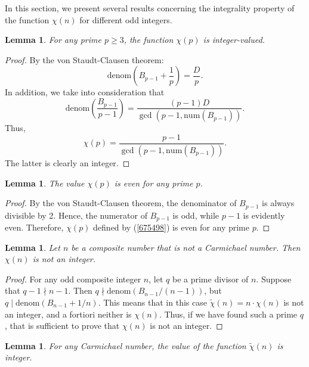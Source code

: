 \documentclass[reqno,a4paper,11pt]{amsart}
\numberwithin{equation}{section}
\newtheorem{lemma}[theorem]{Lemma}
\theoremstyle{definition}
\begin{document}
In this section, we present several results concerning the integrality property  of the function $\chi(n)$ for different odd integers.
\begin{lemma}
For any prime $p\geq 3$, the function $\chi(p)$ is integer-valued.
\end{lemma}
\begin{proof}
By the von Staudt-Clausen theorem:
\[
\mathrm{denom}\left(B_{p-1}+\frac{1}{p}\right)=\frac{D}{p}.
\]
In addition, we take into consideration that
\[
\mathrm{denom}\left(\displaystyle\frac{B_{p-1}}{p-1}\right)=\frac{(p-1)D}{\gcd(p-1, \mathrm{num}(B_{p-1}) )}.
\]
Thus, 
\begin{equation}
\chi(p)=\frac{p-1}{\gcd(p-1, \mathrm{num}(B_{p-1}) )}.
\label{675498}
\end{equation}
The latter is clearly an integer.
\end{proof}
\begin{lemma}  \label{875643}
The value $\chi(p)$  is even for any prime $p$.
\end{lemma}
\begin{proof}
By the von Staudt-Clausen theorem, the denominator of $B_{p-1}$ is always divisible by 2. Hence, the numerator of $B_{p-1}$ is odd, while $p-1$ is evidently even. Therefore, $\chi(p)$ defined by     (\ref{675498}) is even for any prime $p$.
\end{proof}
\begin{lemma}
Let $n$ be a composite number that is not a Carmichael number. Then $\chi(n)$ is not an integer.
\end{lemma}
\begin{proof}
For any odd composite integer $n$, let $q$ be a prime divisor of $n$. Suppose that $q-1\nmid  n-1$.  Then $q\nmid  \mathrm{denom}\left(B_{n-1}/(n-1)\right)$, but $q\mid \mathrm{denom}\left(B_{n-1}+1/n\right)$. This means that in this case $\tilde{\chi}(n)=n\cdot \chi(n)$ is not an integer, and a fortiori neither is $\chi(n)$.   Thus, if we have found such a prime $q$, that is sufficient to prove that $\chi(n)$  is not an integer. 
\end{proof}
\begin{lemma}
For  any Carmichael number, the value of the function $\tilde{\chi}(n)$ is integer.  
\end{lemma}
\end{document}
